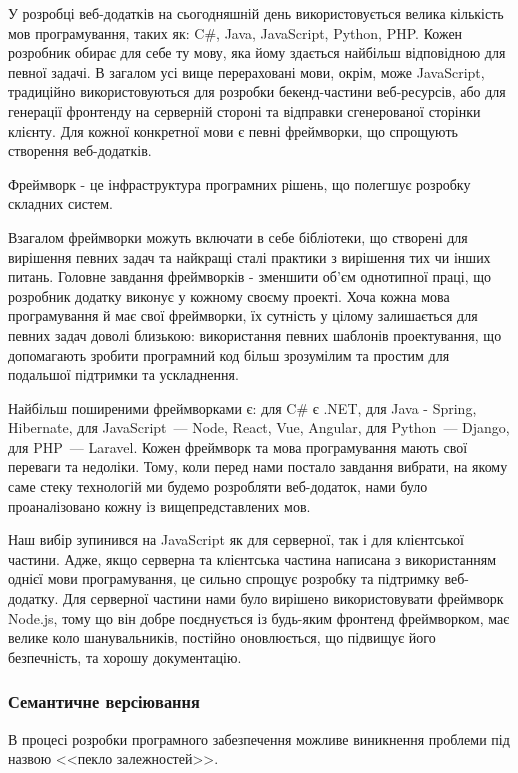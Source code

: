 У розробці веб-додатків на сьогодняшній день використовується велика кількість мов програмування, таких як: C\#, Java, JavaScript, Python, PHP. Кожен розробник обирає для себе ту мову, яка йому здається найбільш відповідною для певної задачі. В загалом усі вище перераховані мови, окрім, може JavaScript, традиційно використовуються для розробки бекенд-частини веб-ресурсів, або для генерації фронтенду на серверній стороні та відправки сгенерованої сторінки клієнту. Для кожної конкретної мови є певні фреймворки, що спрощують створення веб-додатків.

Фреймворк - це інфраструктура програмних рішень, що полегшує розробку складних систем.

Взагалом фреймворки можуть включати в себе бібліотеки, що створені для вирішення певних задач та найкращі сталі практики з вирішення тих чи інших питань. Головне завдання фреймворків - зменшити об'єм однотипної праці, що розробник додатку виконує у кожному своєму проекті. Хоча кожна мова програмування й має свої фреймворки, їх сутність у цілому залишається для певних задач доволі близькою: використання певних шаблонів проектування, що допомагають зробити програмний код більш зрозумілим та простим для подальшої підтримки та ускладнення.

Найбільш поширеними фреймворками є: для C\# є .NET, для Java - Spring, Hibernate, для JavaScript~--- Node, React, Vue, Angular, для Python~--- Django, для PHP~--- Laravel. Кожен фреймворк та мова програмування мають свої переваги та недоліки. Тому, коли перед нами постало завдання вибрати, на якому саме стеку технологій ми будемо розробляти веб-додаток, нами було проаналізовано кожну із вищепредставлених мов.

Наш вибір зупинився на JavaScript як для серверної, так і для клієнтської частини. Адже, якщо серверна та клієнтська частина написана з використанням однієї мови програмування, це сильно спрощує розробку та підтримку веб-додатку. Для серверної частини нами було вирішено використовувати фреймворк Node.js, тому що він добре поєднується із будь-яким фронтенд фреймворком, має велике коло шанувальників, постійно оновлюється, що підвищує його безпечність, та хорошу документацію.  

\subsubsection{Семантичне версіювання} \label{subs:semver}

В процесі розробки програмного забезпечення можливе виникнення проблеми під назвою <<пекло залежностей>>. 

